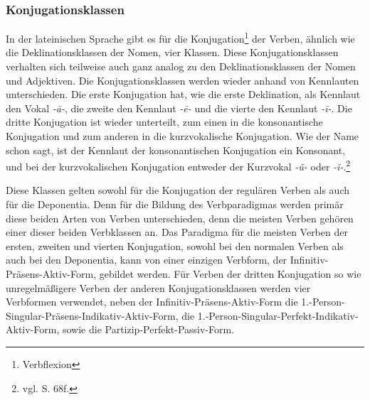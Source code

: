\subsubsection{Konjugationsklassen}
In der lateinischen Sprache gibt es für die Konjugation\footnote{Verbflexion} der Verben, ähnlich wie die Deklinationsklassen der Nomen, vier Klassen. Diese Konjugationsklassen verhalten sich teilweise auch ganz analog zu den Deklinationsklassen der Nomen und Adjektiven. Die Konjugationsklassen werden wieder anhand von Kennlauten unterschieden. Die erste Konjugation hat, wie die erste Deklination, als Kennlaut den Vokal \textit{-ā-}, die zweite den Kennlaut \textit{-ē-} und die vierte den Kennlaut \textit{-ī-}. Die dritte Konjugation ist wieder unterteilt, zum einen in die konsonantische Konjugation und zum anderen in die kurzvokalische Konjugation. Wie der Name schon sagt, ist der Kennlaut der konsonantischen Konjugation ein Konsonant, und bei der kurzvokalischen Konjugation entweder der Kurzvokal \textit{-ǔ-} oder \textit{-ǐ-}.\footnote{vgl. \cite{BAYER-LINDAUER1994} S. 68f.} \par
Diese Klassen gelten sowohl für die Konjugation der regulären Verben als auch für die Deponentia. Denn für die Bildung des Verbparadigmas werden primär diese beiden Arten von Verben unterschieden, denn die meisten Verben gehören einer dieser beiden Verbklassen an. Das Paradigma für die meisten Verben der ersten, zweiten und vierten Konjugation, sowohl bei den normalen Verben als auch bei den Deponentia, kann von einer einzigen Verbform, der Infinitiv-Präsens-Aktiv-Form, gebildet werden. Für Verben der dritten Konjugation so wie unregelmäßigere Verben der anderen Konjugationsklassen werden vier Verbformen verwendet, neben der Infinitiv-Präsens-Aktiv-Form die 1.-Person-Singular-Präsens-Indikativ-Aktiv-Form, die 1.-Person-Singular-Perfekt-Indikativ-Aktiv-Form, sowie die Partizip-Perfekt-Passiv-Form.  \par
